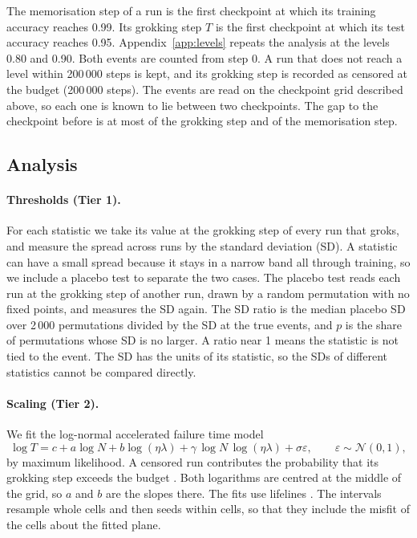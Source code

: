 \documentclass[a4paper,11pt]{article} %
\begin{document}
The memorisation step of a run is the first checkpoint at which its training
accuracy reaches 0.99. Its grokking step $T$ is the first checkpoint at which
its test accuracy reaches 0.95. Appendix~\ref{app:levels} repeats the analysis
at the levels 0.80 and 0.90. Both events are counted from step 0. A run that
does not reach a level within 200\,000 steps is kept, and its grokking step is
recorded as censored at the budget (200\,000 steps). The events are
read on the checkpoint grid described above,
so each one is known to lie between two checkpoints. The gap to the
checkpoint before is at most \NthreeGrok{} of the grokking step and
\NthreeMem{} of the memorisation step.

\subsection{Analysis}\label{sec:analysis}

\paragraph{Thresholds (Tier 1).} For each statistic we take its value at the
grokking step of every run that groks, and measure the spread across runs by the
standard deviation (SD). A statistic can have a small spread because it stays in
a narrow band all through training, so we include a placebo test to
separate the two cases.
The placebo test reads each run at the grokking step of another run,
drawn by a random
permutation with no fixed points, and measures the SD again. The SD
ratio is the median placebo SD over 2\,000 permutations divided by the SD at the
true events, and $p$ is the share of permutations whose SD is no larger. A
ratio near 1 means the statistic is not tied to the event. The SD has the
units of its statistic, so the SDs of different statistics cannot be compared
directly.

\paragraph{Scaling (Tier 2).} We fit the log-normal accelerated failure time
model
\begin{equation}
  \log T = c + a\log N + b\log(\eta\lambda) + \gamma\,\log N\,\log(\eta\lambda)
  + \sigma\varepsilon,\qquad \varepsilon\sim\mathcal{N}(0,1),
  \label{eq:aft}
\end{equation}
by maximum likelihood. A censored run contributes the probability that its
grokking step exceeds the budget
\citep{kalbfleischStatisticalAnalysisFailure2002}. Both logarithms
are centred at
the middle of the grid, so $a$ and $b$ are the slopes there. The fits use
lifelines \citep{davidson-pilonLifelinesSurvivalAnalysis2019}. The intervals
resample whole cells and then seeds within cells, so that they include the
misfit of the cells about the fitted plane.
\end{document}
